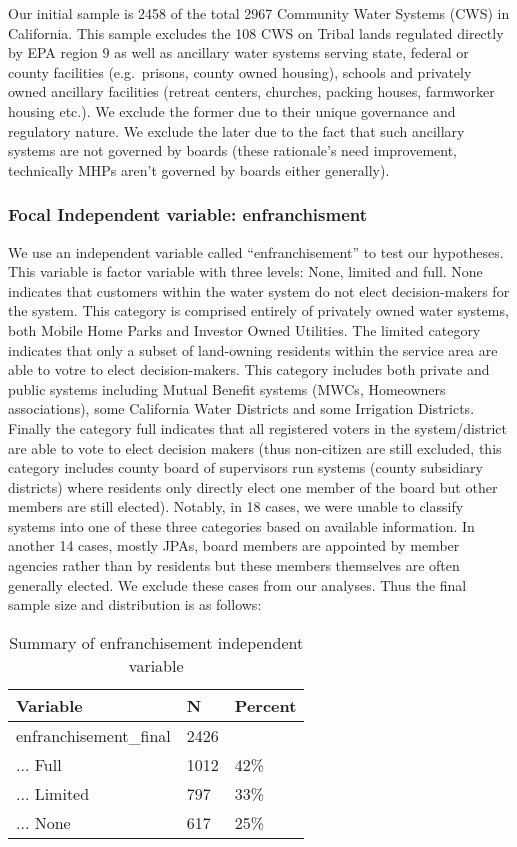 \documentclass[
]{article}
\begin{document}
Our initial sample is 2458 of the total 2967 Community Water Systems
(CWS) in California. This sample excludes the 108 CWS on Tribal lands
regulated directly by EPA region 9 as well as ancillary water systems
serving state, federal or county facilities (e.g.~prisons, county owned
housing), schools and privately owned ancillary facilities (retreat
centers, churches, packing houses, farmworker housing etc.). We exclude
the former due to their unique governance and regulatory nature. We
exclude the later due to the fact that such ancillary systems are not
governed by boards (these rationale's need improvement, technically MHPs
aren't governed by boards either generally).

\hypertarget{focal-independent-variable-enfranchisment}{%
\subsubsection{Focal Independent variable:
enfranchisment}\label{focal-independent-variable-enfranchisment}}

We use an independent variable called ``enfranchisement'' to test our
hypotheses. This variable is factor variable with three levels: None,
limited and full. None indicates that customers within the water system
do not elect decision-makers for the system. This category is comprised
entirely of privately owned water systems, both Mobile Home Parks and
Investor Owned Utilities. The limited category indicates that only a
subset of land-owning residents within the service area are able to
votre to elect decision-makers. This category includes both private and
public systems including Mutual Benefit systems (MWCs, Homeowners
associations), some California Water Districts and some Irrigation
Districts. Finally the category full indicates that all registered
voters in the system/district are able to vote to elect decision makers
(thus non-citizen are still excluded, this category includes county
board of supervisors run systems (county subsidiary districts) where
residents only directly elect one member of the board but other members
are still elected). Notably, in 18 cases, we were unable to classify
systems into one of these three categories based on available
information. In another 14 cases, mostly JPAs, board members are
appointed by member agencies rather than by residents but these members
themselves are often generally elected. We exclude these cases from our
analyses. Thus the final sample size and distribution is as follows:

\begin{table}

\caption{\label{tab:remove unknowns and appointed by member agencies and table}Summary of enfranchisement independent variable}
\centering
\begin{tabular}[t]{lll}
\toprule
Variable & N & Percent\\
\midrule
enfranchisement\_final & 2426 & \\
... Full & 1012 & 42\%\\
... Limited & 797 & 33\%\\
... None & 617 & 25\%\\
\bottomrule
\end{tabular}
\end{table}
\end{document}

